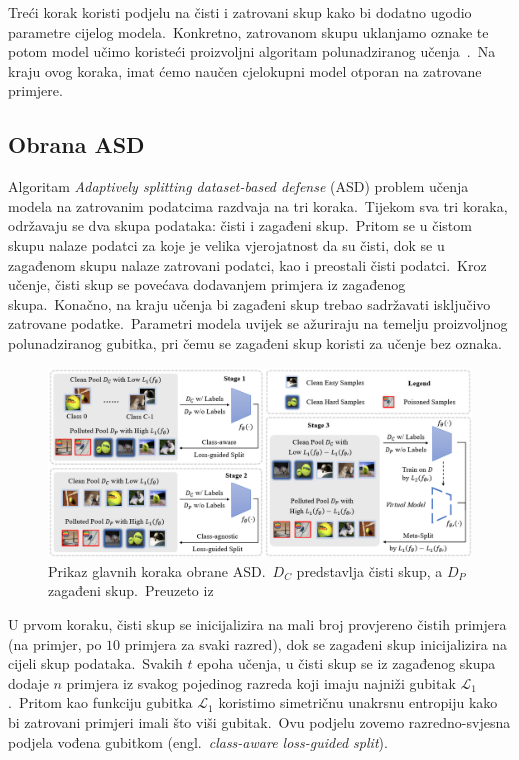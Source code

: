 \documentclass[diplomskirad]{fer}
\begin{document}
Treći korak koristi podjelu na čisti i zatrovani skup kako bi dodatno ugodio parametre cijelog modela.\ 
Konkretno, zatrovanom skupu uklanjamo oznake te potom model učimo koristeći proizvoljni algoritam polunadziranog učenja~\cite{van2020survey}.\ 
Na kraju ovog koraka, imat ćemo naučen cjelokupni model otporan na zatrovane primjere.\ 

\pagebreak

\subsection{Obrana ASD}
\label{sub:asd}

Algoritam \textit{Adaptively splitting dataset-based defense} (ASD) problem učenja modela na zatrovanim podatcima razdvaja na tri koraka.\ 
Tijekom sva tri koraka, održavaju se dva skupa podataka: čisti i zagađeni skup.\ Pritom se u čistom skupu nalaze podatci za koje je velika vjerojatnost da su čisti, dok se u zagađenom skupu nalaze zatrovani podatci, kao i preostali čisti podatci.\ 
Kroz učenje, čisti skup se povećava dodavanjem primjera iz zagađenog skupa.\ Konačno, na kraju učenja bi zagađeni skup trebao sadržavati isključivo zatrovane podatke.\ 
Parametri modela uvijek se ažuriraju na temelju proizvoljnog polunadziranog gubitka, pri čemu se zagađeni skup koristi za učenje bez oznaka.\   

\begin{figure}[h]
  \centering
  \includegraphics[scale=0.65]{./Slike/asd.png}
  \caption{Prikaz glavnih koraka obrane ASD.\ $D_C$ predstavlja čisti skup, a $D_P$ zagađeni skup.\ Preuzeto iz\cite{gao2023backdoor}}
  \label{fig:asd}
\end{figure}
  
U prvom koraku, čisti skup se inicijalizira na mali broj provjereno čistih primjera (na primjer, po $10$ primjera za svaki razred), dok se zagađeni skup inicijalizira na cijeli skup podataka.\ 
Svakih $t$ epoha učenja, u čisti skup se iz zagađenog skupa dodaje $n$ primjera iz svakog pojedinog razreda koji imaju najniži gubitak $\mathcal{L}_1$.\ Pritom kao funkciju gubitka $\mathcal{L}_1$ koristimo simetričnu unakrsnu entropiju kako bi zatrovani primjeri imali što viši gubitak.\ 
Ovu podjelu zovemo razredno-svjesna podjela vođena gubitkom (engl.\ \textit{class-aware loss-guided split}).\ 
  
\end{document}
